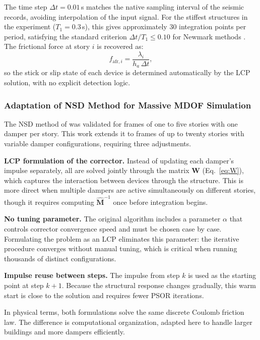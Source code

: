 \documentclass[preprint,12pt,authoryear]{elsarticle}
\newcommand{\ha}{h_a}
\begin{document}
The time step $\Delta t = 0.01$\,s matches the native sampling interval of the seismic
records, avoiding interpolation of the input signal. For the stiffest structures in the
experiment ($T_1 = 0.3$\,s), this gives approximately 30 integration points per period,
satisfying the standard criterion $\Delta t / T_1 \leq 0.10$ for Newmark methods
\citep{chopra_dynamics_2015}. The frictional force at story $i$ is recovered as:
\begin{equation}
    f_{\mathrm{afr},i} = \frac{\lambda_i}{\ha\,\Delta t},
    \label{eq:ffrict}
\end{equation}
so the stick or slip state of each device is determined automatically by the LCP
solution, with no explicit detection logic.

\subsubsection*{Adaptation of NSD Method for Massive MDOF Simulation}
\label{sec:theory:nsd:adaptacion}

The NSD method of \citet{Namorado2024} was validated for frames of one to five stories
with one damper per story. This work extends it to frames of up to twenty stories with
variable damper configurations, requiring three adjustments.

\textbf{LCP formulation of the corrector.}
Instead of updating each damper's impulse separately, all are solved jointly through the
matrix $\bm{W}$ (Eq.~\ref{eq:W}), which captures the interaction between devices through
the structure. This is more direct when multiple dampers are active simultaneously on
different stories, though it requires computing $\hat{\bm{M}}^{-1}$ once before
integration begins.

\textbf{No tuning parameter.}
The original algorithm includes a parameter $\alpha$ that controls corrector convergence
speed and must be chosen case by case. Formulating the problem as an LCP eliminates this
parameter: the iterative procedure converges without manual tuning, which is critical when
running thousands of distinct configurations.

\textbf{Impulse reuse between steps.}
The impulse from step $k$ is used as the starting point at step $k+1$. Because the
structural response changes gradually, this warm start is close to the solution and
requires fewer PSOR iterations.

In physical terms, both formulations solve the same discrete Coulomb friction law. The
difference is computational organization, adapted here to handle larger buildings and more
dampers efficiently.
\end{document}
